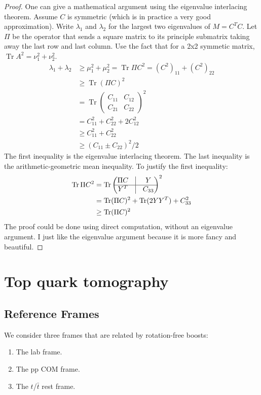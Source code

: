 \begin{proof}
One can give a mathematical argument using the eigenvalue interlacing theorem. Assume $C$ is symmetric (which is in practice a very good approximation).
Write $\lambda_1$ and $\lambda_2$ for the largest two eigenvalues of $M = C^T C$.
Let $\Pi$ be the operator that sends a square matrix to its principle submatrix taking away the last row and last column. Use the fact that for a 2x2 symmetic matrix, $\operatorname{Tr } A^2 = \nu_1^2 + \nu_2^2$.
\begin{align*}
    \lambda_1 + \lambda_2 
    &\geq \mu_1^2 + \mu_2^2 = \operatorname{Tr } \Pi C^2 = (C^2)_{11} + (C^2)_{22} \\
    &\geq \operatorname{Tr } (\Pi C) ^2 \\
    &= \operatorname{Tr } \begin{pmatrix}
        C_{11} & C_{12} \\
        C_{21} & C_{22}
    \end{pmatrix}^2\\
    &= C_{11}^2 + C_{22}^2 + 2 C_{12}^2 \\
    &\geq C_{11}^2 + C_{22}^2 \\
    &\geq (C_{11} \pm C_{22})^2/2
\end{align*}
The first inequality is the eigenvalue interlacing theorem. The last inequality is the arithmetic-geometric mean inequality.
To justify the first inequality:
\begin{align*}
    \operatorname{Tr } \Pi C^2
        &= \operatorname{Tr } \begin{pmatrix}
            \Pi C & \vrule & Y \\
            \hline
            Y^T & \vrule & C_{33}
        \end{pmatrix}^2 \\
        &= \operatorname{Tr }(\Pi C)^2 + \operatorname{Tr }(2 Y Y^T) + C_{33}^2\\
        &\geq \operatorname{Tr }(\Pi C)^2
\end{align*}
The proof could be done using direct computation, without an eigenvalue argument. I just like the eigenvalue argument because it is more fancy and beautiful.
\end{proof}


\section{Top quark tomography}
\subsection{Reference Frames}
We consider three frames that are related by rotation-free boosts:
\begin{enumerate}
    \item The lab frame.
    \item The pp COM frame.
    \item The $t$/$\bar t$ rest frame.
\end{enumerate}

